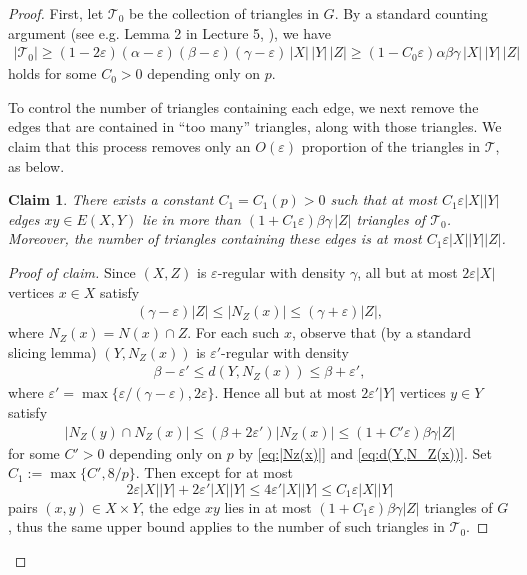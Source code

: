 \documentclass[11pt,reqno]{amsart}
\newenvironment{poc}{\begin{proof}[Proof of claim]\renewcommand*{\qedsymbol}{$\blacksquare$}}{\end{proof}}
\newtheorem{claim}[theorem]{Claim}
\theoremstyle{definition}
\theoremstyle{remark}
\newcommand\dT{\mathcal{T}}
\renewcommand\leq{\leqslant}
\renewcommand\geq{\geqslant}
\renewcommand\le{\leqslant}
\renewcommand\ge{\geqslant}
\begin{document}
\begin{proof}
First, let $\dT_0$ be the collection of triangles in $G$. By a standard counting argument (see e.g. Lemma 2 in Lecture 5, \cite{Conlon}), we have
\begin{align}\label{eq:Tau0}
|\mathcal T_0|\ge(1-2\varepsilon)(\alpha-\varepsilon)(\beta-\varepsilon)(\gamma-\varepsilon)\,|X|\,|Y|\,|Z|\geq (1-C_0\varepsilon)\alpha\beta\gamma\,|X|\,|Y|\,|Z|    
\end{align}
holds for some $C_0>0$ depending only on $p$. 

To control the number of triangles containing each edge, we next remove the edges that are contained in “too many” triangles, along with those triangles. We claim that this process removes only an $O(\varepsilon)$ proportion of the triangles in $\dT$, as below.

\begin{claim}\label{claim:XY}
There exists a constant $C_1=C_1(p)>0$ such that at most $C_1\varepsilon|X||Y|$ edges $xy\in E(X,Y)$ lie in more than $(1+C_1\varepsilon)\beta\gamma\,|Z|$ triangles of $\mathcal T_0$. Moreover, the number of triangles containing these edges is at most $C_1\varepsilon|X||Y||Z|$.
\end{claim}

\begin{poc}
Since $(X,Z)$ is $\varepsilon$-regular with density $\gamma$, all but at most $2\varepsilon |X|$ vertices $x\in X$ satisfy 
\begin{align}\label{eq:|Nz(x)|}
(\gamma-\varepsilon)|Z|\leq|N_Z(x)|\leq (\gamma+\varepsilon)|Z|,    
\end{align}
where $N_Z(x)=N(x)\cap Z$. For each such $x$, observe that (by a standard slicing lemma) $(Y,N_Z(x))$ is $\varepsilon'$-regular with density
\begin{align}\label{eq:d(Y,N_Z(x))}
\beta- \varepsilon'\leq d(Y,N_Z(x))\leq\beta+ \varepsilon',    
\end{align}
where $\varepsilon'=\max\{\varepsilon/(\gamma-\varepsilon), 2\varepsilon\}$. Hence all but at most $2\varepsilon' |Y|$ vertices $y\in Y$ satisfy
\begin{align*}
|N_Z(y)\cap N_Z(x)|\leq (\beta+2\varepsilon')|N_Z(x)|\leq (1+ C'\varepsilon)\beta\gamma |Z| 
\end{align*}
for some $C'>0$ depending only on $p$ by \eqref{eq:|Nz(x)|} and \eqref{eq:d(Y,N_Z(x))}. Set $C_1:=\max\{C',8/p\}$. Then except for at most
$$2\varepsilon |X||Y|+2\varepsilon' |X||Y| \le  4\varepsilon' |X||Y|\leq C_1\varepsilon |X||Y|$$
pairs $(x,y)\in X\times Y$, the edge $xy$ lies in at most $(1+C_1\varepsilon)\beta\gamma |Z|$ triangles of $G$, thus the same upper bound applies to the number of such triangles in $\mathcal T_0$.
\end{poc}


\end{proof}
\end{document}
